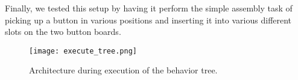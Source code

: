 Finally, we tested this setup by having it perform the simple assembly task of picking up a button in various positions and inserting it into various different slots on the two button boards.

\begin{figure}[ht]
    \texttt{[image: execute\_tree.png]}
    \caption{Architecture during execution of the behavior tree.}
\end{figure}

